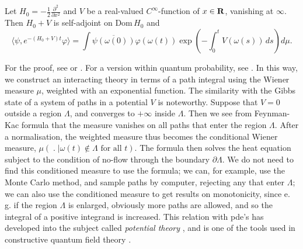 \begin{theorem}
Let $H_0=-\frac{1}{2}\frac{\partial ^2}{\partial x^2}$ and $V$ be a
real-valued $C^\infty$-function of $x\in{\bf R}$, vanishing at $\infty$.
Then $H_0+V$ is self-adjoint on Dom$\,H_0$ and
\begin{equation}
\langle\psi,e^{-(H_0+V)t}\varphi\rangle=\int\overline{\psi(\omega(0))}
\varphi(\omega(t))\exp\left(-\int_0^tV(\omega(s))\,ds\right)d\mu.
\end{equation}
\end{theorem}
For the proof, see \cite{Nelson} or \cite{Simon}. For a version within
quantum probability, see \cite{HIK}. In this way, we construct an
interacting theory in terms of a path integral using the Wiener measure
$\mu$, weighted with an exponential function. The similarity with
the Gibbs state of a system of paths in a potential $V$ is noteworthy.
Suppose that $V=0$ outside a region $\Lambda$, and converges to
$+\infty$ inside $\Lambda$. Then we see from Feynman-Kac formula
that the measure vanishes on all paths that enter the region
$\Lambda$. After a normalisation, the weighted measure thus becomes
the conditional Wiener measure, $\mu(\;.\;|\omega(t)\notin\Lambda
\mbox{ for all }t)$. The formula then solves the heat equation
subject to the condition of no-flow through the boundary $\partial
\Lambda$. We do not need to find this conditioned measure to use
the formula; we can, for example, use the Monte Carlo method, and
sample paths by computer, rejecting any that enter $\Lambda$; we
can also use the conditioned measure to get results on monotonicity,
since e. g. if the region $\Lambda$ is enlarged, obviously more
paths are allowed, and so the integral of a positive integrand
is increased. This relation with pde's has developed into the subject
called {\em potential theory} \cite{Grimmett}, and is one of the
tools used in constructive quantum field theory
\cite{Glimm,Glimm2,Frohlich,Guerra}. 


